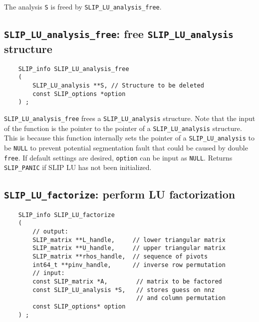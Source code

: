 \documentclass[12pt]{article}
\theoremstyle{definition}
\begin{document}
The analysis \verb|S| is freed by \verb|SLIP_LU_analysis_free|.

\cprotect\subsection{\verb|SLIP_LU_analysis_free|: free \verb|SLIP_LU_analysis| structure}
\label{ss:LU_analysis_free}

\begin{mdframed}[userdefinedwidth=6in]
{\footnotesize
\begin{verbatim}
    SLIP_info SLIP_LU_analysis_free
    (
        SLIP_LU_analysis **S, // Structure to be deleted
        const SLIP_options *option
    ) ;
\end{verbatim}
} \end{mdframed}


\verb|SLIP_LU_analysis_free| frees a \verb|SLIP_LU_analysis| structure.
Note that the input of the function is the pointer to the pointer of a
\verb|SLIP_LU_analysis| structure. This is because this function internally
sets the pointer of a \verb|SLIP_LU_analysis| to be \verb|NULL| to prevent
potential segmentation fault that could be caused by double \verb|free|.
If default settings are desired, \verb|option| can be input as \verb|NULL|.
Returns \verb|SLIP_PANIC| if SLIP LU has not been initialized.

\cprotect\subsection{\verb|SLIP_LU_factorize|: perform LU factorization}
\label{ss:SLIP_LU_factorize}

\begin{mdframed}[userdefinedwidth=6in]
{\footnotesize
\begin{verbatim}
    SLIP_info SLIP_LU_factorize
    (
        // output:
        SLIP_matrix **L_handle,     // lower triangular matrix
        SLIP_matrix **U_handle,     // upper triangular matrix
        SLIP_matrix **rhos_handle,  // sequence of pivots
        int64_t **pinv_handle,      // inverse row permutation
        // input:
        const SLIP_matrix *A,        // matrix to be factored
        const SLIP_LU_analysis *S,   // stores guess on nnz
                                     // and column permutation
        const SLIP_options* option
    ) ;
\end{verbatim}
} \end{mdframed}
\end{document}
